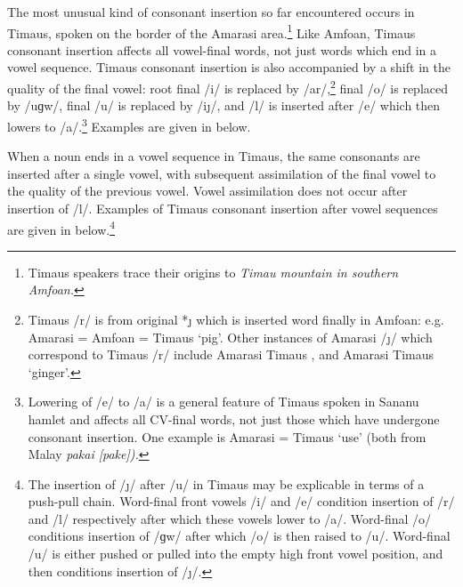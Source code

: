 The most unusual kind of consonant insertion so far encountered
occurs in Timaus, spoken on the border of the Amarasi area.\footnote{
		Timaus speakers trace their origins to \it{Timau} mountain in southern Amfo{\Q}an.}
Like Amfo{\Q}an, Timaus consonant insertion affects all vowel-final words,
not just words which end in a vowel sequence.
Timaus consonant insertion is also accompanied by a shift in the quality of the final vowel:
root final /i/ is replaced by /ar/,\footnote{
		Timaus /r/ is from original *{\j} which is
		inserted word finally in Amfo{\Q}an: e.g. Amarasi 
		= Amfo{\Q}an  = Timaus  `pig'.
		Other instances of Amarasi /\j/ which correspond to Timaus /r/
		include Amarasi  Timaus ,
		and Amarasi  Timaus  `ginger'.}
final /o/ is replaced by /uɡw/,
final /u/ is replaced by /i\j/,
and /l/ is inserted after /e/ which then lowers to /a/.\footnote{
		Lowering of /e/ to /a/ is a general feature of Timaus spoken in Sananu
		hamlet and affects all CV-final words, not just those which have undergone consonant insertion.
		One example is Amarasi  = Timaus  `use' (both from Malay \it{pakai} [pake]).}
Examples are given in  below.

\begin{exe}
	\label{ex:TimConIns}
\end{exe}

When a noun ends in a vowel sequence in Timaus,
the same consonants are inserted after a single vowel,
with subsequent assimilation of the final vowel to the quality of the previous vowel.
Vowel assimilation does not occur after insertion of /l/.
Examples of Timaus consonant insertion after vowel sequences
are given in  below.\footnote{
		The insertion of /\j/ after /u/ in Timaus
		may be explicable in terms of a push-pull chain.
		Word-final front vowels /i/ and /e/ condition insertion of /r/ and /l/
		respectively after which these vowels lower to /a/.
		Word-final /o/ conditions insertion of /ɡw/ after which /o/ is then raised to /u/.
		Word-final /u/ is either pushed or pulled into the empty high front vowel position,
		and then conditions insertion of /\j/.}


